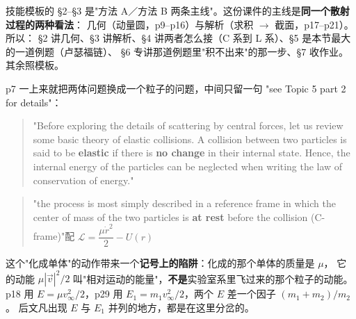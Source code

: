 \documentclass[11pt]{ctexart}
\begin{document}
技能模板的 §2--§3 是"方法 A／方法 B 两条主线"。这份课件的主线是\textbf{同一个散射过程的两种看法}：
几何（动量圆，p9--p16）与解析（求积 $\to$ 截面，p17--p21）。所以：
§2 讲几何、§3 讲解析、§4 讲两者怎么接（C 系到 L 系）、§5 是本节最大的一道例题（卢瑟福链）、
§6 专讲那道例题里"积不出来"的那一步、§7 收作业。其余照模板。




p7 一上来就把两体问题换成一个粒子的问题，中间只留一句 "see Topic 5 part 2 for details"：

\begin{quote}
"Before exploring the details of scattering by central forces, let us review some basic theory of elastic collisions. A collision between two particles is said to be \textbf{elastic} if there is \textbf{no change} in their internal state. Hence, the internal energy of the particles can be neglected when writing the law of conservation of energy."
\end{quote}
\begin{quote}
"the process is most simply described in a reference frame in which the center of mass of the two particles is \textbf{at rest} before the collision (C-frame)"\quad 配 $\mathcal L=\dfrac{\mu\dot r^2}{2}-U(r)$
\end{quote}


这个"化成单体"的动作带来一个\textbf{记号上的陷阱}：化成的那个单体的质量是 $\mu$，
它的动能 $\mu|\vec v|^2/2$ 叫"相对运动的能量"，\textbf{不是}实验室系里飞过来的那个粒子的动能。
p18 用 $E=\mu v_\infty^2/2$，p29 用 $E_1=m_1v_\infty^2/2$，两个 $E$ 差一个因子 $(m_1+m_2)/m_2$。
后文凡出现 $E$ 与 $E_1$ 并列的地方，都是在这里分岔的。
\end{document}
